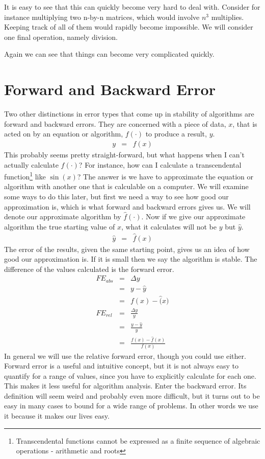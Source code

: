 It is easy to see that this can quickly become very hard to deal with.  Consider for instance multiplying two n-by-n matrices, which would involve $n^{3}$ multiplies.  Keeping track of all of them would rapidly become impossible.  We will consider one final operation, namely division.

Again we can see that things can become very complicated quickly.

\section{Forward and Backward Error}

Two other distinctions in error types that come up in stability of algorithms are forward and backward errors.  They are concerned with a piece of data, $x$, that is acted on by an equation or algorithm, $f(\cdot)$ to produce a result, $y$.
\begin{eqnarray}
y&=&f(x)
\end{eqnarray}
This probably seems pretty straight-forward, but what happens when I can't actually calculate $f(\cdot)$?  For instance, how can I calculate a transcendental function\footnote{Transcendental functions cannot be expressed as a finite sequence of algebraic operations - arithmetic and roots} like $\sin(x)$?  The answer is we have to approximate the equation or algorithm with another one that is calculable on a computer.  We will examine some ways to do this later, but first we need a way to see how good our approximation is, which is what forward and backward errors gives us.  We will denote our approximate algorithm by $\hat f(\cdot)$.  Now if we give our approximate algorithm the true starting value of $x$, what it calculates will not be $y$ but $\hat y$.
\begin{eqnarray}
\hat y&=&\hat f(x)
\end{eqnarray}
The error of the results, given the same starting point, gives us an idea of how good our approximation is.  If it is small then we say the algorithm is stable.  The difference of the values calculated is the forward error.
\begin{eqnarray*}
FE_{abs}&=&\Delta y\\
        &=& y-\hat y\\
        &=& f(x)-\hat(x)\\
FE_{rel}&=&\frac{\Delta y}{y}\\
        &=& \frac{y-\hat y}{y}\\
        &=& \frac{f(x)-\hat f(x)}{f(x)}
\end{eqnarray*}
In general we will use the relative forward error, though you could use either.  Forward error is a useful and intuitive concept, but it is not always easy to quantify for a range of values, since you have to explicitly calculate for each one.  This makes it less useful for algorithm analysis.  Enter the backward error.  Its definition will seem weird and probably even more difficult, but it turns out to be easy in many cases to bound for a wide range of problems.  In other words we use it because it makes our lives easy.


